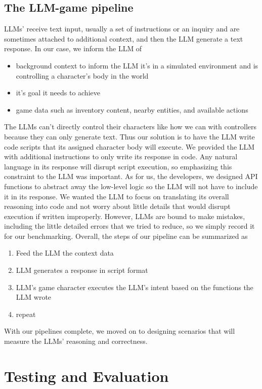 \documentclass{article}
\begin{document}
\subsection{The LLM-game pipeline}
LLMs' receive text input, usually a set of instructions or an inquiry and are sometimes attached to additional context, and then the LLM generate a text response.
In our case, we inform the LLM of
\begin{itemize}
    \item background context to inform the LLM it's in a simulated environment and is controlling a character's body in the world
    \item it's goal it needs to achieve
    \item game data such as inventory content, nearby entities, and available actions
\end{itemize}
The LLMs can't directly control their characters like how we can with controllers because they can only generate text.
Thus our solution is to have the LLM write code scripts that its assigned character body will execute.
We provided the LLM with additional instructions to only write its response in code. Any natural language in its response will disrupt script execution, so emphasizing this constraint to the LLM was important.
As for us, the developers, we designed API functions to abstract away the low-level logic so the LLM will not have to include it in its response.
We wanted the LLM to focus on translating its overall reasoning into code and not worry about little details that would disrupt execution if written improperly.
However, LLMs are bound to make mistakes, including the little detailed errors that we tried to reduce, so we simply record it for our benchmarking.
Overall, the steps of our pipeline can be summarized as 
\begin{enumerate}
    \item Feed the LLM the context data
    \item LLM generates a response in script format
    \item LLM's game character executes the LLM's intent based on the functions the LLM wrote
    \item repeat
\end{enumerate}
With our pipelines complete, we moved on to designing scenarios that will measure the LLMs' reasoning and correctness. 
\section{Testing and Evaluation}
\end{document}
